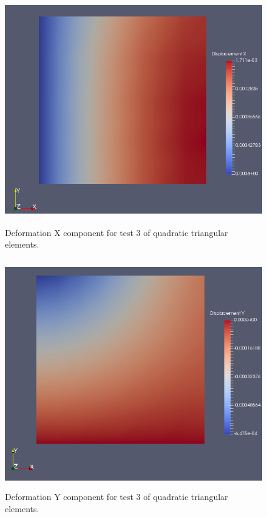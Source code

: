 \documentclass[a4paper, 12pt]{article}
\begin{document}
\begin{figure}[H]
  \centering
  \includegraphics[width=13cm, height=10cm]{Qtri_4_t3_disp_X}
  \caption{Deformation X component for test 3 of quadratic
            triangular elements.}
  \label{fig:quadTri3_x}
\end{figure}

\begin{figure}[H]
  \centering
  \includegraphics[width=13cm, height=10cm]{Qtri_4_t3_disp_Y}
  \caption{Deformation Y component for test 3 of quadratic
            triangular elements.}
  \label{fig:quadTri3_y}
\end{figure}
\end{document}
